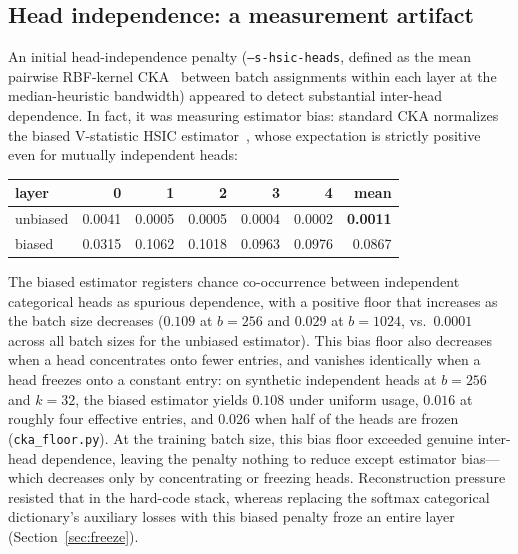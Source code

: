 \subsection{Head independence: a measurement artifact}
\label{sec:hsic}

An initial head-independence penalty (\texttt{--s-hsic-heads}, defined as
the mean pairwise RBF-kernel CKA~\cite{kornblith2019} between batch
assignments within each layer at the median-heuristic bandwidth) appeared
to detect substantial inter-head dependence. In fact, it was measuring
estimator bias: standard CKA normalizes the biased V-statistic HSIC
estimator~\cite[Eq.~3]{kornblith2019}, whose expectation is strictly
positive even for mutually independent heads:

\begin{center}\small
\begin{tabular}{@{}lrrrrrr@{}}
\toprule
layer & 0 & 1 & 2 & 3 & 4 & mean \\
\midrule
unbiased & 0.0041 & 0.0005 & 0.0005 & 0.0004 & 0.0002 & \textbf{0.0011} \\
biased   & 0.0315 & 0.1062 & 0.1018 & 0.0963 & 0.0976 & 0.0867 \\
\bottomrule
\end{tabular}
\end{center}

The biased estimator registers chance co-occurrence between independent
categorical heads as spurious dependence, with a positive floor that
increases as the batch size decreases ($0.109$ at $b{=}256$ and $0.029$
at $b{=}1024$, vs.\ $0.0001$ across all batch sizes for the unbiased
estimator). This bias floor also decreases when a head concentrates onto
fewer entries, and vanishes identically when a head freezes onto a
constant entry: on synthetic independent heads at $b{=}256$ and $k{=}32$,
the biased estimator yields $0.108$ under uniform usage, $0.016$ at
roughly four effective entries, and $0.026$ when half of the heads are
frozen (\texttt{cka\_floor.py}). At the training batch size, this bias
floor exceeded genuine inter-head dependence, leaving the penalty nothing
to reduce except estimator bias---which decreases only by concentrating
or freezing heads. Reconstruction pressure resisted that in the
hard-code stack, whereas replacing the softmax categorical dictionary's
auxiliary losses with this biased penalty froze an entire layer
(Section~\ref{sec:freeze}).

